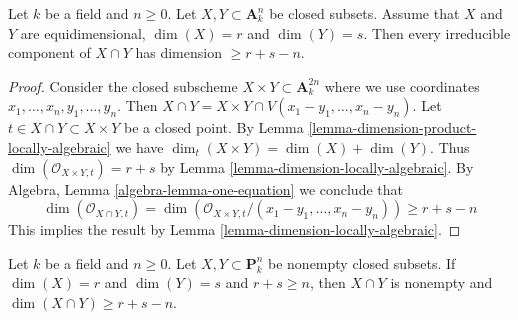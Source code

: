 \begin{lemma}
\label{lemma-intersection-in-affine-space}
Let $k$ be a field and $n \geq 0$. Let $X, Y \subset \mathbf{A}^n_k$
be closed subsets. Assume that $X$ and $Y$ are equidimensional,
$\dim(X) = r$ and $\dim(Y) = s$.
Then every irreducible component of $X \cap Y$ has dimension $\geq r + s - n$.
\end{lemma}

\begin{proof}
Consider the closed subscheme $X \times Y \subset \mathbf{A}^{2n}_k$
where we use coordinates $x_1, \ldots, x_n, y_1, \ldots, y_n$. Then
$X \cap Y = X \times Y \cap V(x_1 - y_1, \ldots, x_n - y_n)$.
Let $t \in X \cap Y \subset X \times Y$ be a closed point.
By Lemma \ref{lemma-dimension-product-locally-algebraic}
we have $\dim_t(X \times Y) = \dim(X) + \dim(Y)$.
Thus $\dim(\mathcal{O}_{X \times Y, t}) = r + s$ by
Lemma \ref{lemma-dimension-locally-algebraic}.
By Algebra, Lemma \ref{algebra-lemma-one-equation}
we conclude that
$$
\dim(\mathcal{O}_{X \cap Y, t}) =
\dim(\mathcal{O}_{X \times Y, t}/(x_1 - y_1, \ldots, x_n - y_n)) \geq
r + s - n
$$
This implies the result by Lemma \ref{lemma-dimension-locally-algebraic}.
\end{proof}

\begin{lemma}
\label{lemma-intersection-in-projective-space}
Let $k$ be a field and $n \geq 0$. Let $X, Y \subset \mathbf{P}^n_k$
be nonempty closed subsets. If $\dim(X) = r$ and $\dim(Y) = s$ and
$r + s \geq n$, then $X \cap Y$ is nonempty and
$\dim(X \cap Y) \geq r + s - n$.
\end{lemma}

